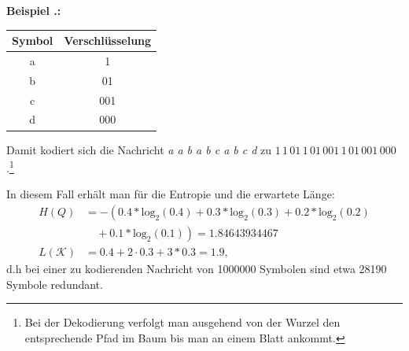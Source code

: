 \documentclass[a4paper,12pt]{article}
\newcounter{Beispiel}
\newenvironment{Beispiel}{
\medskip
        
        \setlength{\parindent}{0pt}
        \addtocounter{Beispiel}{1}
        \textbf{\textsf{Beispiel \thesubsection.\theBeispiel}:}\\}{
        \nopagebreak
        \vspace{-1.0ex}
        \bigskip
        
}
\begin{document}
\begin{Beispiel}
\par
\vspace{0.5cm}
\begin{minipage}[h]{.4\textwidth}
\begin{tabular}{c|c}
Symbol & Verschlüsselung
\\
\hline
a & 1
\\
\hline
b & 01
\\
\hline
c & 001
\\
\hline
d & 000
\end{tabular}
\vspace{3cm}
\end{minipage}
\hfill
 \begin{minipage}[h]{.6\textwidth}
\hspace{1.5cm} 
\end{minipage} 
Damit kodiert sich die Nachricht {\it a 	a 	b 	a 	b 	c 	a 	b 	c 	d} zu
$1\, 	1\, 	01\, 	1\, 	01\, 	001\, 	1\, 	01\, 	001\, 	000$.\footnote{\footnotesize{Bei der Dekodierung verfolgt man ausgehend von der Wurzel den entsprechende Pfad im Baum bis man an einem Blatt ankommt.}} 
\par  
In diesem Fall erhält man für die Entropie und die erwartete Länge:
\begin{align*}
H(Q) &=-\left(  0.4 * \text{log}_{2}(0.4)   +   0.3 * \text{log}_{2}(0.3) +  0.2 * \text{log}_{2}(0.2)\right.\\
     &\left.\quad +  0.1 * \text{log}_{2}(0.1)\right) = 1.84643934467
\\
L(\mathcal{K})&= 0.4 + 2\cdot 0.3 + 3* 0.3 = 1.9,
\end{align*}
d.h bei einer zu kodierenden Nachricht von 1000000 Symbolen sind etwa 28190 Symbole redundant.
\end{Beispiel}
\end{document}

